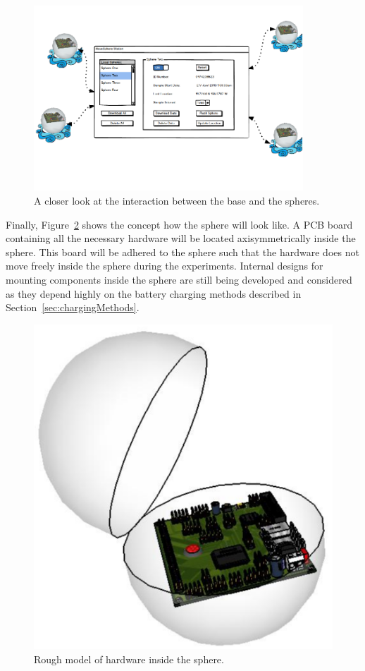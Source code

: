 \begin{figure}[H]
	\centering
	\includegraphics[width=0.9\textwidth]{img/GSV3}
	\caption{A closer look at the interaction between the base and the spheres. \label{fig:GSV3}}
\end{figure}

Finally, Figure~\ref{fig:sphere} shows the concept how the sphere will look like.  A PCB board containing all the necessary hardware will be located axisymmetrically inside the sphere.  This board will be adhered to the sphere such that the hardware does not move freely inside the sphere during the experiments.  Internal designs for mounting components inside the sphere are still being developed and considered as they depend highly on the battery charging methods described in Section~\ref{sec:chargingMethods}.

\begin{figure}[H]
	\centering
	\includegraphics[scale=0.6]{img/Sphere_001}
	\caption{Rough model of hardware inside the sphere. \label{fig:sphere}}
\end{figure}
